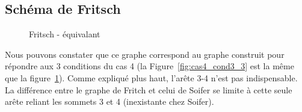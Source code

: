 \documentclass[french]{report}
\begin{document}
\subsection{Schéma de Fritsch}
\begin{figure}[!h]\centering
	\begin{changemargin}{-3cm}{-3cm}
		\begin{center}
			
			\hspace{15pt}
			
			\hspace{15pt}
			
		\end{center}
	\end{changemargin}
\end{figure}
\FloatBarrier	

\begin{figure}[!h]\centering
	\begin{changemargin}{-3cm}{-3cm}
		\begin{center}
			
			\hspace{15pt}
			
			\caption{Fritsch - équivalant}
			\label{fig:Fritsch_anamorphose}
		\end{center}
	\end{changemargin}
\end{figure}
\FloatBarrier	
Nous pouvons constater que ce graphe correspond au graphe construit pour répondre aux 3 conditions du cas 4 (la Figure~\ref{fig:cas4_cond3_3} est la même que la figure~\ref{fig:Fritsch_anamorphose}). 
Comme expliqué plus haut, l’arête 3-4 n'est pas indispensable.
La différence entre le graphe de Fritch et celui de Soifer se limite à cette seule arête reliant les sommets 3 et 4 (inexistante chez Soifer).\\




\end{document}
